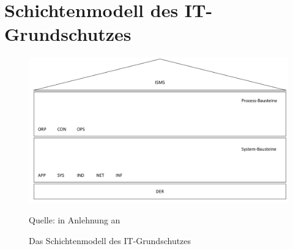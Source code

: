 \section{Schichtenmodell des IT-Grundschutzes}
\begin{figure}[H]
	\centering
	\includegraphics[scale=0.45]{img/bsiSchichtenmodell.pdf}
	\caption{Das Schichtenmodell des IT-Grundschutzes}
	{\footnotesize Quelle: in Anlehnung an \cite[][S.\,9]{bundesamt_fur_sicherheit_in_der_informationstechnik_bsi_it-grundschutz-kompendium_2020}}
	\label{abb:BSISchichtenmodell}
\end{figure}

